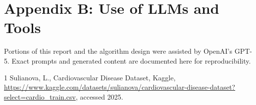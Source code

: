 \documentclass[11pt]{article}
\begin{document}
\section*{Appendix B: Use of LLMs and Tools}
Portions of this report and the algorithm design were assisted by OpenAI's GPT-5. Exact prompts and generated content are documented here for reproducibility.



\begin{thebibliography}{1}
Sulianova, L., Cardiovascular Disease Dataset, Kaggle, \url{https://www.kaggle.com/datasets/sulianova/cardiovascular-disease-dataset?select=cardio_train.csv}, accessed 2025.
\end{thebibliography}
\end{document}
